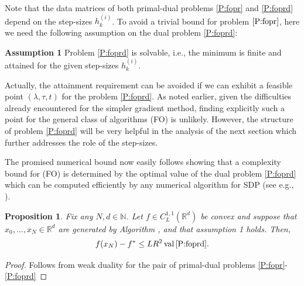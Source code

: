 \documentclass[12pt]{article}
\numberwithin{equation}{section}
\newtheorem{proposition}{Proposition}[section]
\theoremstyle{definition}
\theoremstyle{remark}
\DeclareMathOperator{\val}{val}
\def\real{\mathbb{R}}
\newcommand{\mainalg}{\text{FO}\xspace}
\begin{document}
Note that the data matrices of both primal-dual problems \eqref{P:fopr}
and \eqref{P:foprd} depend on the step-sizes $h^{(i)}_k$.
To avoid a trivial bound for problem $\eqref{P:fopr}$, here we need the following assumption
on the dual problem \eqref{P:foprd}:

{\bf Assumption 1} Problem \eqref{P:foprd} is solvable, i.e., the minimum is finite and attained for the
given step-sizes $h^{(i)}_k$.

Actually, the attainment requirement can be avoided if we can exhibit a feasible point
$(\lambda, \tau, t)$ for the problem \eqref{P:foprd}. As noted earlier, given the difficulties already
encountered for the simpler gradient method, finding explicitly such a point for the general
class of algorithms (FO) is unlikely. However, the structure of problem  \eqref{P:foprd} will be very
helpful in the analysis of the next section which further addresses the role of the
step-sizes.

The promised numerical bound now easily follows showing that a complexity bound for (FO) is
determined by the optimal value of the dual problem \eqref{P:foprd} which can be computed
efficiently by any numerical algorithm for SDP (see e.g.,
\cite{ben2001lectures,Helmberg96aninterior-point,vandenberghe1996semidefinite}).



\begin{proposition}\label{numb} Fix any $N , d \in \mathbb{N}$. Let $f \in C^{1,1}_L(\real^d)$
be convex and suppose that $x_0, \ldots ,x_N \in \real^d$ are generated by Algorithm \mainalg,
and  that assumption 1 holds.
Then,
$$
f(x_N) - f^* \leq LR^2 \val\eqref{P:foprd}.
$$
\end{proposition}

\begin{proof} Follows from weak duality for the pair of primal-dual problems \eqref{P:fopr}-\eqref{P:foprd}
\end{proof}



\end{document}
